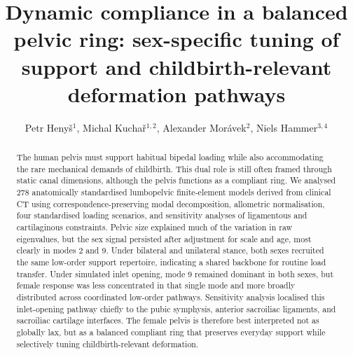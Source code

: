 \documentclass[openacc]{rsproca_new}
\begin{document}
\title{Dynamic compliance in a balanced pelvic ring: sex-specific tuning of support and childbirth-relevant deformation pathways}

\author{Petr Heny\v{s}$^{1}$, Michal Kucha\v{r}$^{1,2}$, Alexander Mor\'{a}vek$^{2}$, Niels Hammer$^{3,4}$}

\address{$^{1}$Institute of New Technologies and Applied Informatics, Faculty of Mechatronics, Informatics and Interdisciplinary Studies, Technical University of Liberec, Liberec, Czech Republic\\
$^{2}$Department of Anatomy, Faculty of Medicine in Hradec Kr\'{a}lov\'{e}, Charles University, Hradec Kr\'{a}lov\'{e}, Czech Republic\\
$^{3}$Division of Macroscopic and Clinical Anatomy, Gottfried Schatz Research Center, Medical University of Graz, Graz, Austria\\
$^{4}$Division of Macroscopic and Clinical Anatomy, Gottfried Schatz Research Center, Medical University of Graz, Graz, Austria; Department of Orthopedic and Trauma Surgery, University of Leipzig, Leipzig, Germany; Division of Biomechatronics, Fraunhofer IWU, Dresden, Germany}

\subject{biomechanics, evolutionary anthropology, obstetrics}



\begin{abstract}
The human pelvis must support habitual bipedal loading while also accommodating the rare mechanical demands of childbirth. This dual role is still often framed through static canal dimensions, although the pelvis functions as a compliant ring. We analysed 278 anatomically standardised lumbopelvic finite-element models derived from clinical CT using correspondence-preserving modal decomposition, allometric normalisation, four standardised loading scenarios, and sensitivity analyses of ligamentous and cartilaginous constraints. Pelvic size explained much of the variation in raw eigenvalues, but the sex signal persisted after adjustment for scale and age, most clearly in modes 2 and 9. Under bilateral and unilateral stance, both sexes recruited the same low-order support repertoire, indicating a shared backbone for routine load transfer. Under simulated inlet opening, mode 9 remained dominant in both sexes, but female response was less concentrated in that single mode and more broadly distributed across coordinated low-order pathways. Sensitivity analysis localised this inlet-opening pathway chiefly to the pubic symphysis, anterior sacroiliac ligaments, and sacroiliac cartilage interfaces. The female pelvis is therefore best interpreted not as globally lax, but as a balanced compliant ring that preserves everyday support while selectively tuning childbirth-relevant deformation.
\end{abstract}
\end{document}
